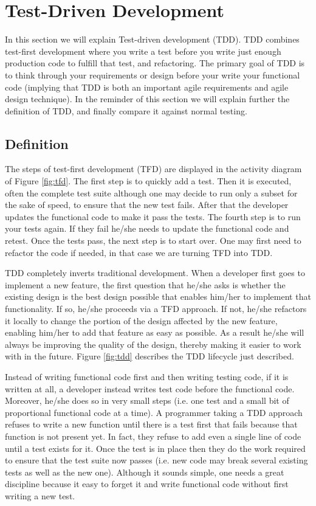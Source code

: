 \section{Test-Driven Development}
\label{sec:tdd}
In this section we will explain Test-driven development (TDD). TDD combines test-first development where you write a test before you write just enough production code to fulfill that test, and refactoring. The primary goal of TDD is to think through your requirements or design before your write your functional code (implying that TDD is both an important agile requirements and agile design technique)\cite{Martin2002}. In the reminder of this section we will explain further the definition of TDD, and finally compare it against normal testing.
\subsection{Definition}
The steps of test-first development (TFD) are displayed in the activity diagram of Figure \ref{fig:tfd}. The first step is to quickly add a test. Then it is executed, often the complete test suite although one may decide to run only a subset for the sake of speed, to ensure that the new test fails. After that the developer updates the functional code to make it pass the tests. The fourth step is to run your tests again. If they fail he/she needs to update the functional code and retest. Once the tests pass, the next step is to start over. One may first need to refactor the code if needed, in that case we are turning TFD into TDD.

TDD completely inverts traditional development. When a developer first goes to implement a new feature, the first question that he/she asks is whether the existing design is the best design possible that enables him/her to implement that functionality. If so, he/she proceeds via a TFD approach. If not, he/she refactors it locally to change the portion of the design affected by the new feature, enabling him/her to add that feature as easy as possible. As a result he/she will always be improving the quality of the design, thereby making it easier to work with in the future. Figure \ref{fig:tdd} describes the TDD lifecycle just described.

Instead of writing functional code first and then writing testing code, if it is written at all, a developer instead writes test code before the functional code. Moreover, he/she does so in very small steps (i.e. one test and a small bit of proportional functional code at a time). A programmer taking a TDD approach refuses to write a new function until there is a test first that fails because that function is not present yet. In fact, they refuse to add even a single line of code until a test exists for it. Once the test is in place then they do the work required to ensure that the test suite now passes (i.e. new code may break several existing tests as well as the new one). Although it sounds simple, one needs a great discipline because it easy to forget it and write functional code without first writing a new test.

